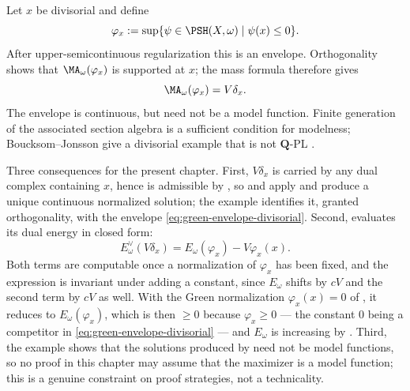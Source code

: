 \begin{example}
\label{ex:ch28-divisorial-green}
Let \(x\) be divisorial and define
\begin{equation}
\label{eq:green-envelope-divisorial}
 \varphi_x:=\sup\{\psi\in\PSH(X,\omega)\mid\psi(x)\leq0\}.
\end{equation}
After upper-semicontinuous regularization this is an envelope.  Orthogonality
shows that \(\MA_\omega(\varphi_x)\) is supported at \(x\); the mass formula
therefore gives
\[
                      \MA_\omega(\varphi_x)=V\delta_x.
\]
The envelope is continuous, but need not be a model function.  Finite
generation of the associated section algebra is a sufficient condition for
modelness; Boucksom--Jonsson give a divisorial example that is not
\(\mathbf Q\)-PL \cite[Theorem~A]{BJGreen24}.

Three consequences for the present chapter.  First, \(V\delta_x\) is carried
by any dual complex containing \(x\), hence is admissible by
, so
 and
 apply and produce a unique continuous normalized
solution; the example identifies it, granted orthogonality, with the
envelope \eqref{eq:green-envelope-divisorial}.  Second,
 evaluates its dual energy in closed form:
\[
 E^\vee_\omega(V\delta_x)=E_\omega(\varphi_x)-V\varphi_x(x).
\]
Both terms are computable once a normalization of \(\varphi_x\) has been
fixed, and the expression is invariant under adding a constant, since
\(E_\omega\) shifts by \(cV\) and the second term by \(cV\) as well.  With
the Green normalization \(\varphi_x(x)=0\) of \cite{BJGreen24}, it reduces to
\(E_\omega(\varphi_x)\), which is then \(\geq0\) because \(\varphi_x\geq0\)
--- the constant \(0\) being a competitor in
\eqref{eq:green-envelope-divisorial} --- and \(E_\omega\) is increasing by
.  Third, the example shows that the
solutions produced by  need not be model
functions, so no proof in this chapter may assume that the maximizer is a
model function; this is a genuine constraint on proof strategies, not a
technicality.
\end{example}

